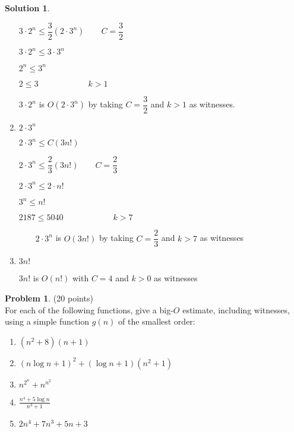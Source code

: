 \documentclass{article}
\theoremstyle{definition}
\newtheorem{problem}{Problem}
\newtheorem*{solution}{Solution}
\begin{document}
\begin{solution}
\begin{enumerate}
\qquad $3\cdot 2^{n}\leq \dfrac{3}{2}(2\cdot 3^{n})\qquad C=\dfrac{3}{2}$

\qquad $3\cdot 2^{n}\leq 3\cdot 3^{n}$

\qquad $2^{n}\leq 3^{n}$

\qquad $2\leq 3\qquad \qquad \qquad k>1$

\qquad $3\cdot 2^{n}$ is $O(2\cdot 3^{n})$ by taking $C=\dfrac{3}{2}$ and $%
k>1$ as witnesses.

\item $2\cdot 3^{n}$

\qquad $2\cdot 3^{n}\leq C(3n!)$

\qquad $2\cdot 3^{n}\leq \dfrac{2}{3}(3n!)\qquad C=\dfrac{2}{3}$

\qquad $2\cdot 3^{n}\leq 2\cdot n!$

\qquad $3^{n}\leq n!$

\qquad $2187\leq 5040\qquad \qquad \qquad k>7$

$\qquad 2\cdot 3^{n}$ is $O(3n!)$ by taking $C=\dfrac{2}{3}$ and $k>7$ as
witnesses$\qquad \qquad $ \bigskip \newline

\item $3n!$ \bigskip

\qquad $3n!$ is $O(n!)$ with $C=4$ and $k>0$ as witnesses
\end{enumerate}
\end{solution}


\newpage

\begin{problem} (20 points)\\
For each of the following functions, give a big-$O$ estimate, including witnesses, using a simple function $g(n)$ of the smallest order:
\begin{enumerate}
\item $(n^2+8)(n+1)$
\item $(n\log{n} + 1)^2+(\log{n}+1)(n^2+1)$
\item $\displaystyle n^{2^n}+n^{n^2}$
\item $\displaystyle \frac{n^4+5\log{n}}{n^3+1}$
\item $2n^4+7n^3+5n+3$
\end{enumerate}
\end{problem}
\end{document}
